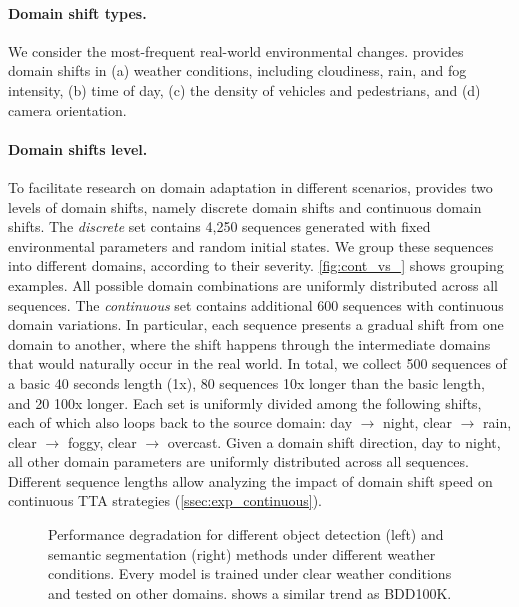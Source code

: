 \paragraph{Domain shift types.} We consider the most-frequent real-world environmental changes. \thedataset{} provides domain shifts in (a) weather conditions, including cloudiness, rain, and fog intensity, (b) time of day, (c) the density of vehicles and pedestrians, and (d) camera orientation. 

\paragraph{Domain shifts level.} To facilitate research on domain adaptation in different scenarios, \thedataset{} provides two levels of domain shifts, namely discrete domain shifts and continuous domain shifts. 
The \textit{discrete} set contains 4,250 sequences generated with fixed environmental parameters and random initial states. We group these sequences into different domains, according to their severity. \autoref{fig:cont_vs_} shows grouping examples. All possible domain combinations are uniformly distributed across all sequences. 
The \textit{continuous} set contains additional 600 sequences with continuous domain variations. In particular, each sequence presents a gradual shift from one domain to another, where the shift happens through the intermediate domains that would naturally occur in the real world. In total, we collect 500 sequences of a basic 40 seconds length (1x), 80 sequences 10x longer than the basic length, and 20 100x longer. Each set is uniformly divided among the following shifts, each of which also loops back to the source domain: day $\xrightarrow{}$ night,  clear $\xrightarrow{}$ rain, clear $\xrightarrow{}$ foggy, clear $\xrightarrow{}$ overcast. Given a domain shift direction, \eg{} day to night, all other domain parameters are uniformly distributed across all sequences. 
Different sequence lengths allow analyzing the impact of domain shift speed on continuous TTA strategies (\autoref{ssec:exp_continuous}).

\begin{figure*}[t!]
    \centering
    \vspace{-1em}
     \hspace{8mm}
    \vspace{-0.5em}
    \caption{Performance degradation for different object detection (left) and semantic segmentation (right) methods under different weather conditions. Every model is trained under clear weather conditions and tested on other domains. \thedataset shows a similar trend as BDD100K. }
    \label{fig:trend}
\end{figure*}

